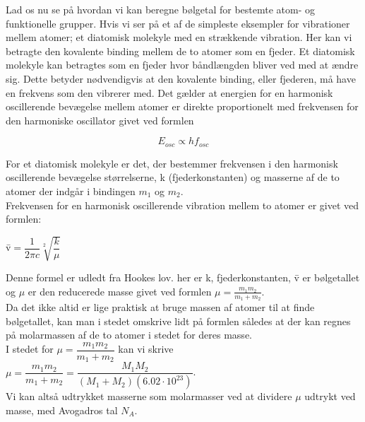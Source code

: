 Lad os nu se på hvordan vi kan beregne bølgetal for bestemte atom- og funktionelle grupper. Hvis vi ser på et af de simpleste eksempler for vibrationer mellem atomer; et diatomisk molekyle med en strækkende vibration. Her kan vi betragte den kovalente binding mellem de to atomer som en fjeder. Et diatomisk molekyle kan betragtes som en fjeder hvor båndlængden bliver ved med at ændre sig. Dette betyder nødvendigvis at den kovalente binding, eller fjederen, må have en frekvens som den vibrerer med. Det gælder at energien for en harmonisk oscillerende bevægelse mellem atomer er direkte proportionelt med frekvensen for den harmoniske oscillator givet ved formlen

\begin{center}
\begin{equation}
E_{osc} \propto h f_{osc}
\end{equation}
\end{center}

For et diatomisk molekyle er det, der bestemmer frekvensen i den harmonisk oscillerende bevægelse størrelserne, k (fjederkonstanten) og masserne af de to atomer der indgår i bindingen $m_1$ og $m_2$.
\\

Frekvensen for en harmonisk oscillerende vibration mellem to atomer er givet ved formlen:

\begin{center}
\={v}$= \dfrac{1}{2 \pi c} \sqrt[2]{\dfrac{k}{\mu}}$
\end{center}

Denne formel er udledt fra Hookes lov. her er k, fjederkonstanten, \={v} er bølgetallet og $\mu$ er den reducerede masse givet ved formlen $\mu = \frac{m_1 m_2}{m_1 + m_2}$. 
\\

Da det ikke altid er lige praktisk at bruge massen af atomer til at finde bølgetallet, kan man i stedet omskrive lidt på formlen således at der kan regnes på molarmassen af de to atomer i stedet for deres masse.
\\

I stedet for $\mu = \dfrac{m_1 m_2}{m_1 + m_2}$ kan vi skrive $\mu = \dfrac{m_1 m_2}{m_1 + m_2} = \dfrac{M_1 M_2}{(M_1 + M_2 ) (6.02 \cdot 10^{23})}$. 
\\

Vi kan altså udtrykket masserne som molarmasser ved at dividere $\mu$ udtrykt ved masse, med Avogadros tal $N_A$.
\\

